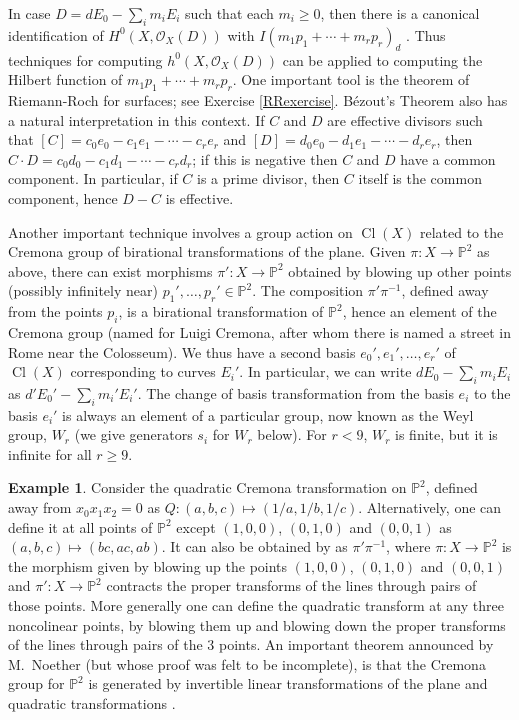 \documentclass[11pt,twoside]{amsart}
\numberwithin{equation}{section}
\theoremstyle{definition}
\newtheorem{example}[theorem]{Example}
\begin{document}
In case $D=dE_0-\sum_im_iE_i$ such that each $m_i\geq0$, then there is a canonical identification of
$H^0(X,{{\mathcal O}}_X(D))$ with $I(m_1p_1+\cdots+m_rp_r)_d$ \cite[Proposition IV.1.1]{refKrakow}. 
Thus techniques for computing
$h^0(X,{{\mathcal O}}_X(D))$ can be applied to computing the Hilbert function of $m_1p_1+\cdots+m_rp_r$.
One important tool is the theorem of Riemann-Roch for surfaces; see Exercise \ref{RRexercise}.
B\'ezout's Theorem also has a natural interpretation in this context. If $C$ and $D$ are effective divisors
such that $[C]=c_0e_0-c_1e_1-\cdots-c_re_r$ and $[D]=d_0e_0-d_1e_1-\cdots-d_re_r$,
then $C\cdot D=c_0d_0-c_1d_1-\cdots-c_rd_r$; if this is negative then $C$ and $D$ have a common 
component. In particular, if $C$ is a prime divisor, then $C$ itself is the common component,
hence $D-C$ is effective.

Another important technique involves a group action on $\operatorname{Cl}(X)$
related to the Cremona group of birational transformations of the plane. Given $\pi:X\to{\mathbb{P}^{2}}$ as above,
there can exist morphisms $\pi':X\to{\mathbb{P}^{2}}$ obtained by blowing up other points (possibly infinitely near)
$p_1',\ldots,p_r'\in{\mathbb{P}^{2}}$. The composition $\pi'\pi^{-1}$, defined away from the points $p_i$,
is a birational transformation of ${\mathbb{P}^{2}}$, hence an element of the Cremona group
(named for Luigi Cremona, after whom there is named a street in Rome near the Colosseum).
We thus have a second basis $e_0',e_1',\ldots,e_r'$ of $\operatorname{Cl}(X)$
corresponding to curves $E_i'$. In particular, we can write $dE_0-\sum_im_iE_i$ as $d'E_0'-\sum_im_i'E_i'$. 
The change of basis transformation from the basis $e_i$ to the basis $e_i'$ is always an element
of a particular group, now known as the Weyl group, $W_r$
(we give generators $s_i$ for $W_r$ below). 
For $r<9$, $W_r$ is finite, but it is infinite for all $r\geq9$. 

\begin{example}
Consider the quadratic Cremona transformation on ${\mathbb{P}^{2}}$, defined away from
$x_0x_1x_2=0$ as $Q:(a,b,c)\mapsto(1/a,1/b,1/c)$. Alternatively, one can define it
at all points of ${\mathbb{P}^{2}}$ except $(1,0,0)$, $(0,1,0)$ and $(0,0,1)$ as
$(a,b,c)\mapsto (bc,ac,ab)$. It can also be obtained by as $\pi'\pi^{-1}$, where
$\pi:X\to{\mathbb{P}^{2}}$ is the morphism given by blowing up the points $(1,0,0)$, $(0,1,0)$ and $(0,0,1)$
and $\pi':X\to {\mathbb{P}^{2}}$ contracts the proper transforms of the lines through pairs of those points.
More generally one can define the quadratic transform at any three noncolinear points,
by blowing them up and blowing down the proper transforms of the lines through
pairs of the 3 points. An important theorem announced by M.\ Noether 
(but whose proof was felt to be incomplete), is that the Cremona group for ${\mathbb{P}^{2}}$ is generated
by invertible linear transformations of the plane and quadratic transformations \cite{refA}.
\end{example}
\end{document}
